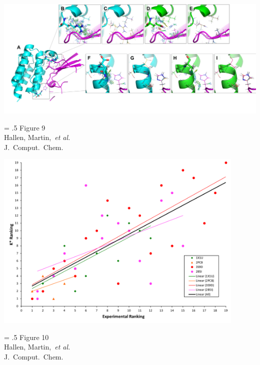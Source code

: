 \begin{center}
 \includegraphics[width=\textwidth]{figures/designExamples.png}
\end{center}
\vspace{0.25in}
\hspace*{3in}
{\Large
\begin{minipage}[t]{3in}
\baselineskip = .5\baselineskip
Figure 9 \\
Hallen, Martin,~\textit{et al.}\\
J.\ Comput.\ Chem.
\end{minipage}
}

\begin{center}
\includegraphics[width=0.9\textwidth]{figures/Rankings.png}
\end{center}
\vspace{0.25in}
\hspace*{3in}
{\Large
\begin{minipage}[t]{3in}
\baselineskip = .5\baselineskip
Figure 10 \\
Hallen, Martin,~\textit{et al.}\\
J.\ Comput.\ Chem.
\end{minipage}
}
